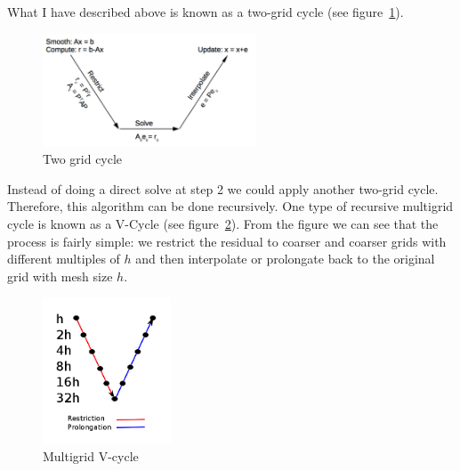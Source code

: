 \documentclass[11pt]{article}
\numberwithin{equation}{section}    %
\begin{document}
What I have described above is known as a two-grid cycle (see figure~\ref{fig:TwoGrid}).
\begin{figure}[h!]
\centering
\includegraphics[width=2.5in]{../figures/TwoGrid}
\caption{Two grid cycle}
\label{fig:TwoGrid}
\end{figure}
Instead of doing a direct solve at step 2 we could apply another two-grid cycle. Therefore, this algorithm can be done recursively. One type of recursive multigrid cycle is known as a V-Cycle (see figure~\ref{fig:vcycle}). From the figure we can see that the process is fairly simple: we restrict the residual to coarser and coarser grids with different multiples of $h$ and then interpolate or prolongate back to the original grid with mesh size $h$.
\begin{figure}[h!]
\centering
\includegraphics[width=1.5in]{Vcycle}
\caption{Multigrid V-cycle}
\label{fig:vcycle}
\end{figure}
\end{document}
